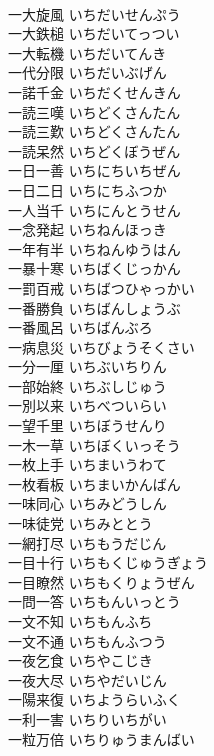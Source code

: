 \documentclass[8pt]{extreport}
\begin{document}
\begin{CJK}{UTF8}{min}
\\	一大旋風	いちだいせんぷう	
\\	一大鉄槌	いちだいてっつい	
\\	一大転機	いちだいてんき	
\\	一代分限	いちだいぶげん	
\\	一諾千金	いちだくせんきん	
\\	一読三嘆	いちどくさんたん	
\\	一読三歎	いちどくさんたん	
\\	一読呆然	いちどくぼうぜん	
\\	一日一善	いちにちいちぜん	
\\	一日二日	いちにちふつか	
\\	一人当千	いちにんとうせん	
\\	一念発起	いちねんほっき	
\\	一年有半	いちねんゆうはん	
\\	一暴十寒	いちばくじっかん	
\\	一罰百戒	いちばつひゃっかい	
\\	一番勝負	いちばんしょうぶ	
\\	一番風呂	いちばんぶろ	
\\	一病息災	いちびょうそくさい	
\\	一分一厘	いちぶいちりん	
\\	一部始終	いちぶしじゅう	
\\	一別以来	いちべついらい	
\\	一望千里	いちぼうせんり	
\\	一木一草	いちぼくいっそう	
\\	一枚上手	いちまいうわて	
\\	一枚看板	いちまいかんばん	
\\	一味同心	いちみどうしん	
\\	一味徒党	いちみととう	
\\	一網打尽	いちもうだじん	
\\	一目十行	いちもくじゅうぎょう	
\\	一目瞭然	いちもくりょうぜん	
\\	一問一答	いちもんいっとう	
\\	一文不知	いちもんふち	
\\	一文不通	いちもんふつう	
\\	一夜乞食	いちやこじき	
\\	一夜大尽	いちやだいじん	
\\	一陽来復	いちようらいふく	
\\	一利一害	いちりいちがい	
\\	一粒万倍	いちりゅうまんばい	

\end{CJK}
\end{document}
